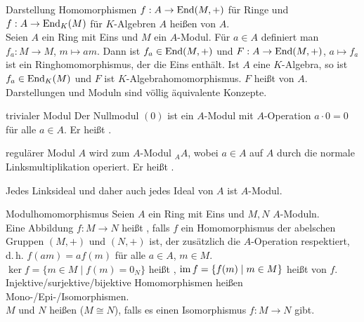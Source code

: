 \begin{Def}{Darstellung}
    Homomorphismen $f: A \rightarrow \operatorname{End}(M,+)$ für Ringe
    und $f: A \rightarrow \operatorname{End}_K(M)$ für $K$-Algebren $A$ heißen
     von $A$. \\
    Seien $A$ ein Ring mit Eins und $M$ ein $A$-Modul.
    Für $a \in A$ definiert man $f_a: M \rightarrow M$, $m \mapsto am$.
    Dann ist $f_a \in \operatorname{End}(M,+)$ und $F: A \rightarrow \operatorname{End}(M,+)$,
    $a \mapsto f_a$ ist ein Ringhomomorphismus, der die Eins enthält. 
    Ist $A$ eine $K$-Algebra, so ist $f_a \in \operatorname{End}_K(M)$ und $F$ ist
    $K$-Algebrahomomorphismus.
    $F$ heißt  von $A$. \\
    Darstellungen und Moduln sind völlig äquivalente Konzepte.
\end{Def}

\begin{Def}{trivialer Modul}
    Der Nullmodul $(0)$ ist ein $A$-Modul mit $A$-Operation
    $a \cdot 0 = 0$ für alle $a \in A$.
    Er heißt .
\end{Def}

\begin{Def}{regulärer Modul}
    $A$ wird zum $A$-Modul ${}_A A$, wobei $a \in A$ auf $A$ durch
    die normale Linksmultiplikation operiert.
    Er heißt .
\end{Def}

\begin{Kor}
    Jedes Linksideal und daher auch jedes Ideal von $A$ ist $A$-Modul.
\end{Kor}

\begin{Def}{Modulhomomorphismus}
    Seien $A$ ein Ring mit Eins und $M, N$ $A$-Moduln. \\
    Eine Abbildung $f: M \rightarrow N$ heißt
    , falls $f$ ein
    Homomorphismus der abelschen Gruppen $(M,+)$ und $(N,+)$ ist,
    der zusätzlich die $A$-Operation respektiert, d.\,h.
    $f(am) = af(m)$ für alle $a \in A$, $m \in M$. \\
    $\ker f = \{m \in M \;|\; f(m) = 0_N\}$ heißt ,
    $\operatorname{im} f = \{f(m) \;|\; m \in M\}$ heißt  von $f$. \\
    Injektive/surjektive/bijektive Homomorphismen heißen
    Mono-/Epi-/Isomorphismen. \\
    $M$ und $N$ heißen 
    ($M \cong N$), falls es einen Isomorphismus $f: M \rightarrow N$ gibt.
\end{Def}

